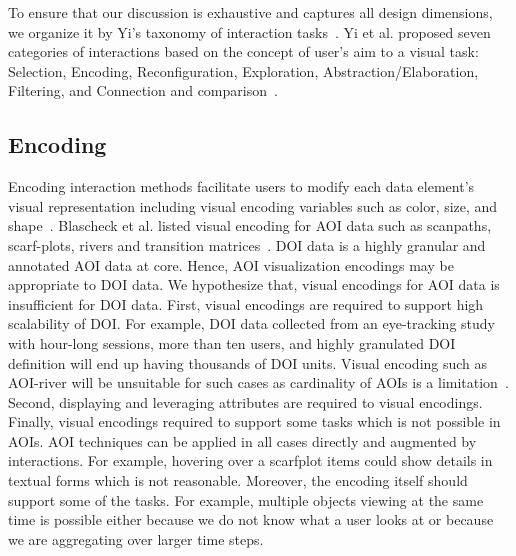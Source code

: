To ensure that our discussion is exhaustive and captures all design dimensions, we organize it by Yi's taxonomy of interaction tasks~\cite{yi2007toward}. Yi et al. proposed seven categories of interactions based on the concept of user's aim to a visual task: Selection, Encoding, Reconfiguration, Exploration, Abstraction/Elaboration, Filtering, and Connection and comparison~\cite{yi2007toward}. 

\subsection{Encoding}
Encoding interaction methods facilitate users to modify each data element's visual representation including visual encoding variables such as color, size, and shape~\cite{yi2007toward}. Blascheck et al. listed visual encoding for AOI data such as scanpaths, scarf-plots, rivers and transition matrices~\cite{blascheck2014state}. DOI data is a highly granular and annotated AOI data at core. Hence, AOI visualization encodings may be appropriate to DOI data. We hypothesize that, visual encodings for AOI data is insufficient for DOI data. First, visual encodings are required to support high scalability of DOI. For example, DOI data collected from an eye-tracking study with hour-long sessions, more than ten users, and highly granulated DOI definition will end up having thousands of DOI units. Visual encoding such as AOI-river will be unsuitable for such cases as cardinality of AOIs is a limitation~\cite{burch2013aoi}. Second, displaying and leveraging attributes are required to visual encodings. Finally, visual encodings required to support some tasks which is not possible in AOIs. AOI techniques can be applied in all cases directly and augmented by interactions. For example, hovering over a scarfplot items could show details in textual forms which is not reasonable. Moreover, the encoding itself should support some of the tasks. For example, multiple objects viewing at the same time is possible either because we do not know what a user looks at or because we are aggregating over larger time steps.

